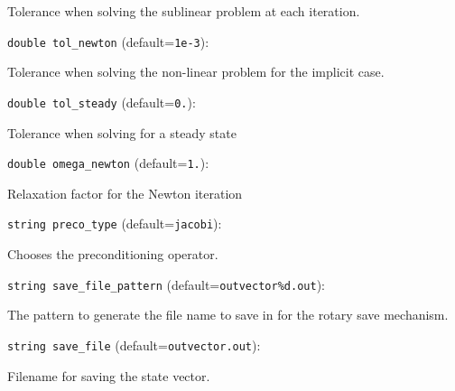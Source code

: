 Tolerance when solving the sublinear problem
at each iteration.

\item\verb+double tol_newton+ {\rm(default=\verb|1e-3|)}:

Tolerance when solving the non-linear problem
for the implicit case.

\item\verb+double tol_steady+ {\rm(default=\verb|0.|)}:

Tolerance when solving for a steady state

\item\verb+double omega_newton+ {\rm(default=\verb|1.|)}:

Relaxation factor for the Newton iteration

\item\verb+string preco_type+ {\rm(default=\verb|jacobi|)}:

Chooses the preconditioning operator. 

\item\verb+string save_file_pattern+ {\rm(default=\verb|outvector%d.out|)}:

The pattern to generate the file name to save in for
the rotary save mechanism.

\item\verb+string save_file+ {\rm(default=\verb|outvector.out|)}:

Filename for saving the state vector.

